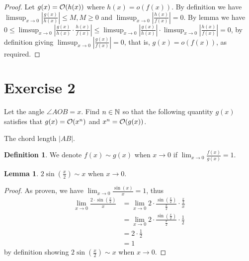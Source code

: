 \documentclass{homework}
\newcommand{\N}{\bb{N}} %
\newcommand{\ra}{\rightarrow}
\newcommand{\?}{\stackrel{?}{=}}
\theoremstyle{definition}
\newtheorem*{definition}{Definition}
\newtheorem*{lemma}{Lemma}
\begin{document}
\begin{proof}
    Let $g(x)=\cal{O}(h(x))$ where $h(x)=o(f(x))$. By definition we have $\limsup_{x\ra0}|\frac{g(x)}{h(x)}|\leq M, M\geq0$ and $\limsup_{x\ra0}|\frac{h(x)}{f(x)}|=0$. By lemma we have $0\leq\limsup_{x\ra0}|\frac{g(x)}{h(x)}\cdot\frac{h(x)}{f(x)}|\leq\limsup_{x\ra0}|\frac{g(x)}{h(x)}|\cdot\limsup_{x\ra0}|\frac{h(x)}{f(x)}|=0$, by definition giving $\limsup_{x\ra0}|\frac{g(x)}{f(x)}|=0$, that is, $g(x)=o(f(x))$, as required.
\end{proof}

\newpage
\section*{Exercise 2}
Let the angle $\angle AOB=x$. Find $n\in\N$ so that the following quantity $g(x)$ satisfies that $g(x)=\cal{O}(x^n)$ and $x^n=\cal{O}(g(x))$.


\question[1] The chord length $|AB|$.

\begin{definition}
    We denote $f(x)\sim g(x)$ when $x\to0$ if $\lim_{x\to0}\frac{f(x)}{g(x)}=1$.
\end{definition}

\begin{lemma}
    $2\sin(\frac{x}2)\sim x$ when $x\to0$.

    \begin{proof}
        As proven, we have $\lim_{x\to0}\frac{\sin(x)}{x}=1$, thus \begin{align*}
            \lim_{x\to0}\frac{2\cdot\sin(\frac{x}2)}{x}&=\lim_{x\to0}2\cdot\frac{\sin(\frac{x}2)}{\frac{x}2}\cdot\frac{\frac{x}2}{x}\\
            &=\lim_{x\to0}2\cdot\frac{\sin(\frac{x}2)}{\frac{x}2}\cdot\frac12\\
            &=2\cdot\frac12\\
            &=1
        \end{align*}
        by definition showing $2\sin(\frac{x}2)\sim x$ when $x\to0$.
    \end{proof}
\end{lemma}
\end{document}
